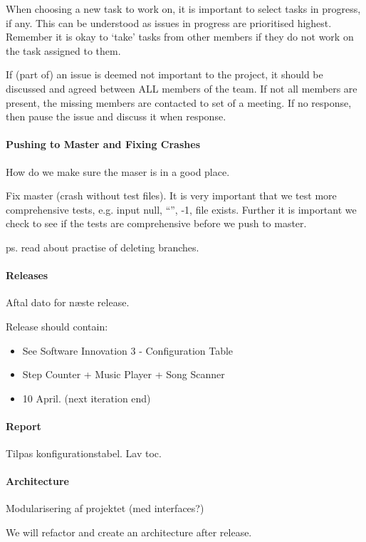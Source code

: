 When choosing a new task to work on, it is important to select tasks in progress, if any. This can be understood as issues in progress are prioritised highest. Remember it is okay to ‘take’ tasks from other members if they do not work on the task assigned to them.

If (part of) an issue is deemed not important to the project, it should be discussed and agreed between ALL members of the team. If not all members are present, the missing members are contacted to set of a meeting. If no response, then pause the issue and discuss it when response.

\paragraph{Pushing to Master and Fixing Crashes}
How do we make sure the maser is in a good place.

Fix master (crash without test files).
It is very important that we test more comprehensive tests, e.g. input null, “”, -1, file exists. 
Further it is important we check to see if the tests are comprehensive before we push to master.

ps. read about practise of deleting branches.

\paragraph{Releases}
Aftal dato for næste release.

Release should contain:
\begin{itemize}
\item See Software Innovation 3 - Configuration Table
\item Step Counter + Music Player + Song Scanner
\item 10 April. (next iteration end)
\end{itemize}

\paragraph{Report}
Tilpas konfigurationstabel.
Lav toc. 

\paragraph{Architecture}
Modularisering af projektet (med interfaces?)

We will refactor and create an architecture after release.
